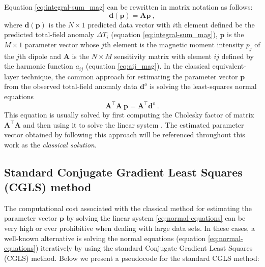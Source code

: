 Equation \ref{eq:integral-sum_mag} can be rewritten in matrix notation as follows:
\begin{equation}
\mathbf{d}(\mathbf{p}) = \mathbf{A} \mathbf{p} \: ,
\label{eq:predicted-data-vector_mag}
\end{equation}
where $\mathbf{d}(\mathbf{p})$ is the $N \times 1$ predicted data vector with $i$th element defined
be the predicted total-field anomaly $\Delta T_{i}$ (equation \ref{eq:integral-sum_mag}),
$\mathbf{p}$ is the $M \times 1$ parameter vector whose $j$th element is the magnetic moment intensity
$p_{j}$ of the $j$th dipole and $\mathbf{A}$ is the $N \times M$ sensitivity matrix with element 
$ij$ defined by the harmonic function $a_{ij}$ (equation \ref{eq:aij_mag}).
In the classical equivalent-layer technique, the common approach for 
estimating the parameter vector $\mathbf{p}$ from the observed 
total-field anomaly data $\mathbf{d}^{o}$ is solving the least-squares normal equations
\begin{equation}
\mathbf{A}^{\top}\mathbf{A} \: \mathbf{p} = 
\mathbf{A}^{\top} \mathbf{d}^{o} \: .
\label{eq:normal-equations}
\end{equation}
This equation is usually solved by first computing the Cholesky factor of matrix
$\mathbf{A}^{\top}\mathbf{A}$ and then using it to solve the linear system
\citep[][ p. 262]{golub-vanloan2013}. 
The estimated parameter vector obtained by following this approach will be 
referenced throughout this work as the \textit{classical solution}.

\subsection{Standard Conjugate Gradient Least Squares (CGLS) method}

The computational cost associated with the classical method for estimating the parameter 
vector $\mathbf{p}$ by solving the linear system \ref{eq:normal-equations} can be very high 
or ever prohibitive when dealing with large data sets. In these cases, a well-known alternative
is solving the normal equations (equation \ref{eq:normal-equations}) iteratively by 
using the standard Conjugate Gradient Least Squares (CGLS) method. Below we present a pseudocode 
for the standard CGLS method:

